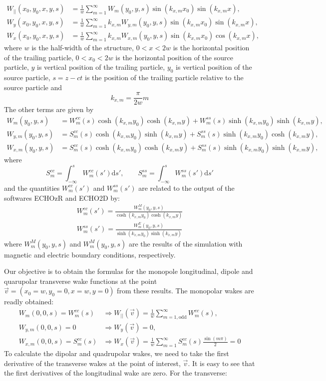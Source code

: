 \documentclass[
	12pt,				%
	openright,			%
	oneside,			%
	a4paper,		%
	chapter=TITLE,		%
	section=TITLE,		%
    brazil,				%
	english,			%
	sumario=tradicional,
	]{abntex2}
\begin{document}
\begin{apendicesenv}
\begin{align}
W_{||}(x_0,y_0,x,y,s) &= \frac1w\sum_{m=1}^\infty W_m(y_0,y,s)\sin(k_{x,m}x_0)\sin(k_{x,m}x), \\
W_y(x_0,y_0,x,y,s) &= \frac1w\sum_{m=1}^\infty k_{x,m}W_{y,m}(y_0,y,s)\sin(k_{x,m}x_0)\sin(k_{x,m}x), \\
W_x(x_0,y_0,x,y,s) &= \frac1w\sum_{m=1}^\infty k_{x,m}W_{x,m}(y_0,y,s)\sin(k_{x,m}x_0)\cos(k_{x,m}x),
\end{align}
where $w$ is the half-width of the structure, $0<x<2w$ is the horizontal position of the trailing particle, $0<x_0<2w$ is the horizontal position of the source particle, $y$ is vertical position of the trailing particle, $y_0$ is vertical position of the source particle, $s=z-ct$ is the position of the trailing particle relative to the source particle and
\begin{equation}
k_{x,m} = \frac{\pi}{2w}m
\end{equation}
The other terms are given by
\begin{align}
W_m(y_0,y,s)     &= W^{cc}_m(s)\cosh(k_{x,m}y_0)\cosh(k_{x,m}y) + W^{ss}_m(s)\sinh(k_{x,m}y_0)\sinh(k_{x,m}y), \\
W_{y,m}(y_0,y,s) &= S^{cc}_m(s)\cosh(k_{x,m}y_0)\sinh(k_{x,m}y) + S^{ss}_m(s)\sinh(k_{x,m}y_0)\cosh(k_{x,m}y), \\
W_{x,m}(y_0,y,s) &= S^{cc}_m(s)\cosh(k_{x,m}y_0)\cosh(k_{x,m}y) + S^{ss}_m(s)\sinh(k_{x,m}y_0)\sinh(k_{x,m}y),
\end{align}
where
\begin{equation}
S^{cc}_m = \int_{-\infty}^s W^{cc}_m(s')\mathrm{d}s', \qquad S^{ss}_m = \int_{-\infty}^s W^{ss}_m(s')\mathrm{d}s'
\end{equation}
and the quantities $W^{cc}_m(s')$ and $W^{ss}_m(s')$ are related to the output of the softwares ECHOzR and ECHO2D by:
\begin{align}
W^{cc}_m(s') = \frac{W_m^M(y_0,y,s)}{\cosh(k_{x,m}y_0)\cosh(k_{x,m}y)} \\
W^{ss}_m(s') = \frac{W_m^E(y_0,y,s)}{\sinh(k_{x,m}y_0)\sinh(k_{x,m}y)}
\end{align}
where $W_m^M(y_0,y,s)$ and $W_m^M(y_0,y,s)$ are the results of the simulation with magnetic and electric boundary conditions, respectively.


Our objective is to obtain the formulas for the monopole longitudinal, dipole and quarupolar transverse wake functions at the point $\vec{v} = (x_0=w,y_0=0,x=w,y=0)$ from these results. The monopolar wakes are readly obtained:
\begin{align}
W_m(0,0,s) = W^{cc}_m(s) &\Rightarrow W_{||}(\vec{v}) = \frac1w\sum^\infty_{m=1,\mathrm{odd}} W^{cc}_m(s), \\
W_{y,m}(0,0,s) = 0 &\Rightarrow W_y(\vec{v}) = 0, \\
W_{x,m}(0,0,s) = S^{cc}_m(s) &\Rightarrow W_x(\vec{v}) = \frac1w\sum^\infty_{m=1} S^{cc}_m(s)\frac{\sin(m\pi)}{2} = 0
\end{align}
To calculate the dipolar and quadrupolar wakes, we need to take the first derivative of the transverse wakes at the point of interest, $\vec{v}$. It is easy to see that the first derivatives of the longitudinal wake are zero. For the transverse:


\end{apendicesenv}
\end{document}
